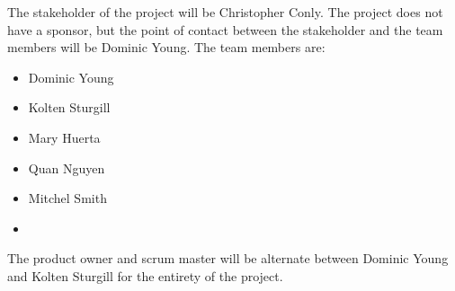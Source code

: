 The stakeholder of the project will be Christopher Conly. The project does not have a sponsor, but the point of contact between the stakeholder and the team members will be Dominic Young. The team members are:

\begin{itemize}
  \item Dominic Young
  \item Kolten Sturgill
  \item Mary Huerta
  \item Quan Nguyen
  \item Mitchel Smith
  \item 
\end{itemize}

The product owner and scrum master will be alternate between Dominic Young and Kolten Sturgill for the entirety of the project.
